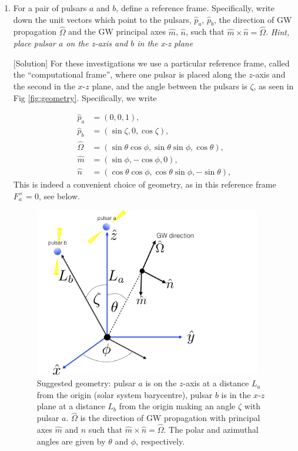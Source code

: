 \documentclass[article, onecolumn, ,nofootinbib,nopreprintnumbers]{revtex4}
\begin{document}
\begin{enumerate}
\item For a pair of pulsars $a$ and $b$, define a reference frame. Specifically, write down the unit vectors which point to the pulsars, $\hat{p}_a$, $\hat{p}_b$, the direction of GW propagation $\hat{\Omega}$ and the GW principal axes $\hat m$, $\hat n$, such that $\hat m\times \hat n = \hat \Omega$.  {\it Hint, place pulsar $a$ on the z-axis and $b$ in the x-z plane}

[Solution] For these investigations we use a particular reference frame,
called the ``computational frame'',  where one pulsar is placed along the
$z$-axis and the second in the $x$-$z$ plane, and the angle between the pulsars is
$\zeta$, as seen in Fig \ref{fig:geometry}. Specifically, we write

\begin{subequations}
	\label{e:coord}
	\begin{align}
	\hat p_a		&=(0,0,1), \\
	\hat p_b		&=(\sin\zeta,0,\cos\zeta),\\
	\hat \Omega 	&=(\sin\theta\cos\phi,\sin\theta\sin\phi,\cos\theta),\\
	\hat m		&=(\sin\phi,-\cos\phi,0),\\
	\hat n		&=(\cos\theta\cos\phi,\cos\theta\sin\phi,-\sin\theta),
	\end{align}
\end{subequations}
This is indeed a convenient choice of geometry, as in this reference frame $F_a^\times = 0$, see below.
\begin{figure}[h]
		\centering
		\includegraphics[width=3.9in]{pta_geometry.pdf}
		\caption[Typical pulsar timing array geometry]{Suggested geometry: pulsar $a$ is on the $z$-axis at a distance $L_a$ from the origin (solar system barycentre), pulsar $b$ is in the $x$-$z$ plane at a distance $L_b$ from the origin making an angle $\zeta$ with pulsar $a$. $\hat\Omega$ is the direction of GW propagation with principal axes $\hat m$ and $\hat n$ such that  $\hat m \times \hat n =\hat\Omega$. The polar and azimuthal angles are given by $\theta$ and $\phi$, respectively.}

\end{figure}
\end{enumerate}
\end{document}
